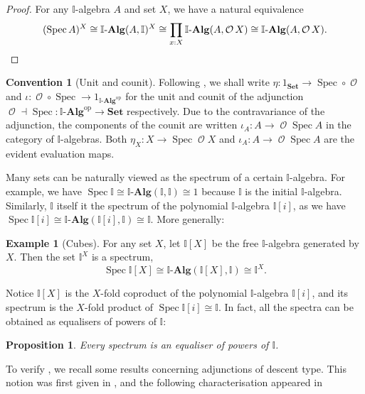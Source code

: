 \documentclass[a4paper,12pt]{amsart}
\newtheorem{proposition}[theorem]{Proposition}
\theoremstyle{definition}
\newtheorem{convention}[theorem]{Convention}
\newtheorem{example}[theorem]{Example}
\newcommand{\mc}[1]{\mathcal{#1}}
\newcommand{\mb}[1]{\mathbf{#1}}
\newcommand{\mbb}[1]{\mathbb{#1}}
\newcommand{\I}{\mbb I}
\newcommand{\Set}{\mb{Set}}
\newcommand{\alg}{\text{-}\mb{Alg}}
\newcommand{\op}{^{\mathrm{op}}}
\newcommand{\spec}{\operatorname{Spec}}
\newcommand{\opens}{\operatorname{\mc{O}}} %
\begin{document}
\begin{proof}
  For any $\I$-algebra $A$ and set $X$, we have a natural equivalence 
  \[ (\spec A)^X \cong \I\alg(A,\I)^X \cong \prod_{x:X}\I\alg(A,\opens{X})\cong \I\alg(A,\opens{X}). \qedhere\]
\end{proof}

\begin{convention}[Unit and counit]
  Following \citet{Taylor2011}, we shall write $\eta\colon 1_{\Set}\to \spec\circ\opens$ and $\iota\colon \opens\circ\spec\to 1_{\I\alg\op}$ for the unit and counit of the adjunction $\opens\dashv \spec\colon \I\alg\op\to \Set$ respectively. Due to the contravariance of the adjunction, the components of the counit are written $\iota_A\colon A\to \opens\spec{A}$ in the category of $\I$-algebras. Both $\eta_X\colon X\to \spec\opens{X}$ and $\iota_A\colon A\to \opens\spec{A}$ are the evident evaluation maps.
\end{convention}

Many sets can be naturally viewed as the spectrum of a certain $\I$-algebra. For example, we have $\spec \I \cong \I\alg(\I,\I) \cong 1$ because  $\I$ is the initial $\I$-algebra. Similarly, $\I$ itself it the spectrum of the polynomial $\I$-algebra $\I[i]$, as we have $\spec \I[i] \cong \I\alg(\I[i],\I) \cong \I$. More generally:

\begin{example}[Cubes]\label{exm:cubeaffine}
  For any set $X$, let $\I[X]$ be the free $\I$-algebra generated by $X$. Then the set $\I^X$ is a spectrum,
  \[ \spec \I[X] \cong \I\alg(\I[X],\I) \cong \I^X. \]
\end{example}

Notice $\I[X]$ is the $X$-fold coproduct of the polynomial $\I$-algebra $\I[i]$, and its spectrum is the $X$-fold product of $\spec\I[i] \cong \I$. In fact, all the spectra can be obtained as equalisers of powers of $\I$:

\begin{proposition}\label{prop:spectra-are-powers-of-the-interval}
  Every spectrum is an equaliser of powers of $\I$. 
\end{proposition}

To verify , we recall some results concerning adjunctions of descent type. This notion was first given in \citet{BarrMichael1985Ttat}, and the following characterisation appeared in \citet{kelly1993adjunctions}
\end{document}
